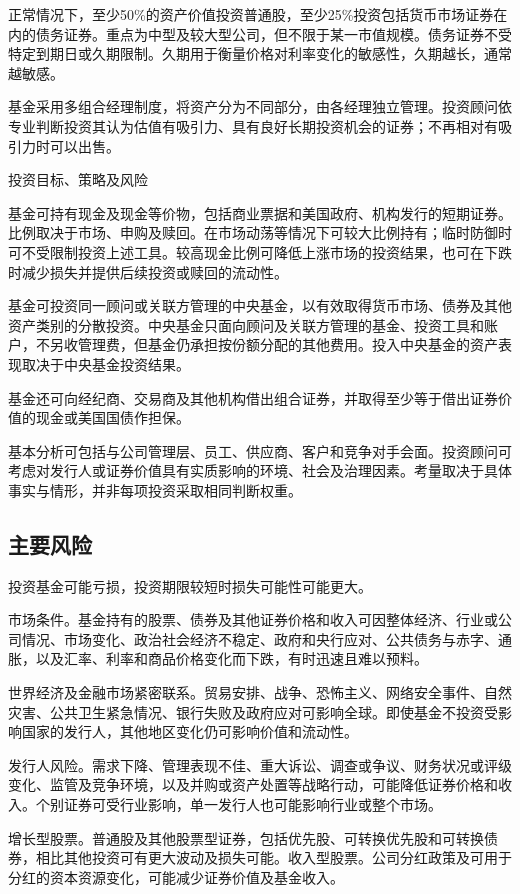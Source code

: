 \documentclass[UTF8,fontset=none,11pt,a4paper]{ctexart}
\begin{document}
正常情况下，至少50\%的资产价值投资普通股，至少25\%投资包括货币市场证券在内的债务证券。重点为中型及较大型公司，但不限于某一市值规模。债务证券不受特定到期日或久期限制。久期用于衡量价格对利率变化的敏感性，久期越长，通常越敏感。


基金采用多组合经理制度，将资产分为不同部分，由各经理独立管理。投资顾问依专业判断投资其认为估值有吸引力、具有良好长期投资机会的证券；不再相对有吸引力时可以出售。


投资目标、策略及风险


基金可持有现金及现金等价物，包括商业票据和美国政府、机构发行的短期证券。比例取决于市场、申购及赎回。在市场动荡等情况下可较大比例持有；临时防御时可不受限制投资上述工具。较高现金比例可降低上涨市场的投资结果，也可在下跌时减少损失并提供后续投资或赎回的流动性。


基金可投资同一顾问或关联方管理的中央基金，以有效取得货币市场、债券及其他资产类别的分散投资。中央基金只面向顾问及关联方管理的基金、投资工具和账户，不另收管理费，但基金仍承担按份额分配的其他费用。投入中央基金的资产表现取决于中央基金投资结果。


基金还可向经纪商、交易商及其他机构借出组合证券，并取得至少等于借出证券价值的现金或美国国债作担保。


基本分析可包括与公司管理层、员工、供应商、客户和竞争对手会面。投资顾问可考虑对发行人或证券价值具有实质影响的环境、社会及治理因素。考量取决于具体事实与情形，并非每项投资采取相同判断权重。


\subsection*{主要风险}
投资基金可能亏损，投资期限较短时损失可能性可能更大。


市场条件。基金持有的股票、债券及其他证券价格和收入可因整体经济、行业或公司情况、市场变化、政治社会经济不稳定、政府和央行应对、公共债务与赤字、通胀，以及汇率、利率和商品价格变化而下跌，有时迅速且难以预料。


世界经济及金融市场紧密联系。贸易安排、战争、恐怖主义、网络安全事件、自然灾害、公共卫生紧急情况、银行失败及政府应对可影响全球。即使基金不投资受影响国家的发行人，其他地区变化仍可影响价值和流动性。


发行人风险。需求下降、管理表现不佳、重大诉讼、调查或争议、财务状况或评级变化、监管及竞争环境，以及并购或资产处置等战略行动，可能降低证券价格和收入。个别证券可受行业影响，单一发行人也可能影响行业或整个市场。


增长型股票。普通股及其他股票型证券，包括优先股、可转换优先股和可转换债券，相比其他投资可有更大波动及损失可能。收入型股票。公司分红政策及可用于分红的资本资源变化，可能减少证券价值及基金收入。
\end{document}
